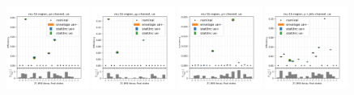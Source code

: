 \begin{figure}
    \centering
    \includegraphics[width=0.24\textwidth]{chapters/Appendix/sectionTTSyst/figures/afterCorr/icata0_ch0_ue.png}
    \includegraphics[width=0.24\textwidth]{chapters/Appendix/sectionTTSyst/figures/afterCorr/icata0_ch1_ue.png}
    \includegraphics[width=0.24\textwidth]{chapters/Appendix/sectionTTSyst/figures/afterCorr/icata0_ch2_ue.png}
    \includegraphics[width=0.24\textwidth]{chapters/Appendix/sectionTTSyst/figures/afterCorr/icata0_ch3_ue.png}


\end{figure}
